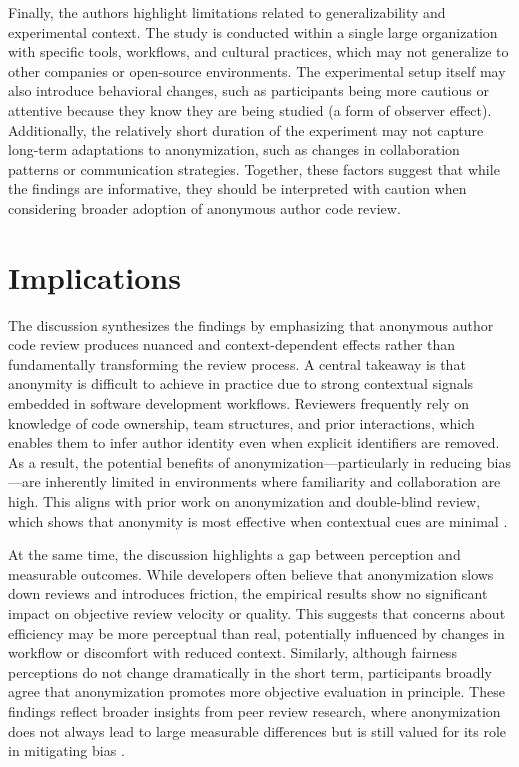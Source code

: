 Finally, the authors highlight limitations related to generalizability and experimental context. The study is conducted within a single large organization with specific tools, workflows, and cultural practices, which may not generalize to other companies or open-source environments. The experimental setup itself may also introduce behavioral changes, such as participants being more cautious or attentive because they know they are being studied (a form of observer effect). Additionally, the relatively short duration of the experiment may not capture long-term adaptations to anonymization, such as changes in collaboration patterns or communication strategies. Together, these factors suggest that while the findings are informative, they should be interpreted with caution when considering broader adoption of anonymous author code review.

\section{Implications}
The discussion synthesizes the findings by emphasizing that anonymous author code review produces nuanced and context-dependent effects rather than fundamentally transforming the review process. A central takeaway is that anonymity is difficult to achieve in practice due to strong contextual signals embedded in software development workflows. Reviewers frequently rely on knowledge of code ownership, team structures, and prior interactions, which enables them to infer author identity even when explicit identifiers are removed. As a result, the potential benefits of anonymization—particularly in reducing bias—are inherently limited in environments where familiarity and collaboration are high. This aligns with prior work on anonymization and double-blind review, which shows that anonymity is most effective when contextual cues are minimal \cite{goues2018effectiveness,ceci1984blind}.

At the same time, the discussion highlights a gap between perception and measurable outcomes. While developers often believe that anonymization slows down reviews and introduces friction, the empirical results show no significant impact on objective review velocity or quality. This suggests that concerns about efficiency may be more perceptual than real, potentially influenced by changes in workflow or discomfort with reduced context. Similarly, although fairness perceptions do not change dramatically in the short term, participants broadly agree that anonymization promotes more objective evaluation in principle. These findings reflect broader insights from peer review research, where anonymization does not always lead to large measurable differences but is still valued for its role in mitigating bias \cite{tomkins2017reviewer,mcNutt1990effects}.

